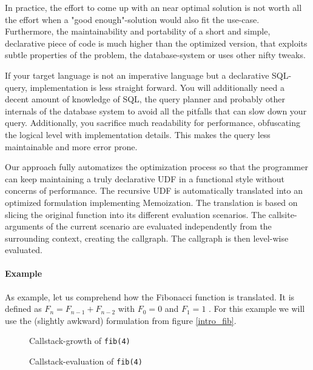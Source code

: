 In practice, the effort to come up with an near optimal solution is not worth all the effort when a "good enough"-solution would also fit the use-case. Furthermore, the maintainability and portability of a short and simple, declarative piece of code is much higher than the optimized version, that exploits subtle properties of the problem, the database-system or uses other nifty tweaks.

If your target language is not an imperative language but a declarative SQL-query, implementation is less straight forward. You will additionally need a decent amount of knowledge of SQL, the query planner and probably other internals of the database system to avoid all the pitfalls that can slow down your query. Additionally, you sacrifice much readability for performance, obfuscating the logical level with implementation details. This makes the query less maintainable and more error prone.

Our approach fully automatizes the optimization process so that the programmer can keep maintaining a truly declarative UDF in a functional style without concerns of performance. The recursive UDF is automatically translated into an optimized formulation implementing Memoization. The translation is based on slicing the original function into its different evaluation scenarios. The callsite-arguments of the current scenario are evaluated independently from the surrounding context, creating the callgraph. The callgraph is then level-wise evaluated.

\paragraph*{Example}

As example, let us comprehend how the Fibonacci function is translated. It is defined as $F_n = F_{n-1} + F_{n-2}$ with $F_0 = 0$ and $F_1 = 1$ \cite[p. 79]{TAOCP_Knuth}. For this example we will use the (slightly awkward) formulation from figure \autoref{intro_fib}.

\begin{figure}[h]\small
    \begin{minipage}[b]{.47\linewidth}
        
        \caption{Callstack-growth of \texttt{fib(4)}}
        \label{fib_4_callstack}
    \end{minipage}\hfill
    \begin{minipage}[b]{.5\linewidth}
    
        \caption{Callstack-evaluation of \texttt{fib(4)}}
        \label{fib_4_callstack_evaluation}
    \end{minipage}
\end{figure}


